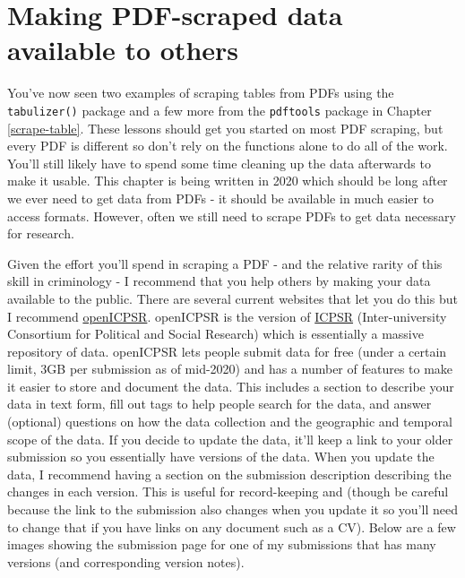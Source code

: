 \documentclass[
  12pt,
]{book}
\begin{document}
\hypertarget{making-pdf-scraped-data-available-to-others}{%
\section{Making PDF-scraped data available to others}\label{making-pdf-scraped-data-available-to-others}}

You've now seen two examples of scraping tables from PDFs using the \texttt{tabulizer()} package and a few more from the \texttt{pdftools} package in Chapter \ref{scrape-table}. These lessons should get you started on most PDF scraping, but every PDF is different so don't rely on the functions alone to do all of the work. You'll still likely have to spend some time cleaning up the data afterwards to make it usable. This chapter is being written in 2020 which should be long after we ever need to get data from PDFs - it should be available in much easier to access formats. However, often we still need to scrape PDFs to get data necessary for research.

Given the effort you'll spend in scraping a PDF - and the relative rarity of this skill in criminology - I recommend that you help others by making your data available to the public. There are several current websites that let you do this but I recommend \href{https://www.icpsr.umich.edu/web/pages/NACJD/index.html}{openICPSR}. openICPSR is the version of \href{https://www.icpsr.umich.edu/web/pages/}{ICPSR} (Inter-university Consortium for Political and Social Research) which is essentially a massive repository of data. openICPSR lets people submit data for free (under a certain limit, 3GB per submission as of mid-2020) and has a number of features to make it easier to store and document the data. This includes a section to describe your data in text form, fill out tags to help people search for the data, and answer (optional) questions on how the data collection and the geographic and temporal scope of the data. If you decide to update the data, it'll keep a link to your older submission so you essentially have versions of the data. When you update the data, I recommend having a section on the submission description describing the changes in each version. This is useful for record-keeping and (though be careful because the link to the submission also changes when you update it so you'll need to change that if you have links on any document such as a CV). Below are a few images showing the submission page for one of my submissions that has many versions (and corresponding version notes).
\end{document}
